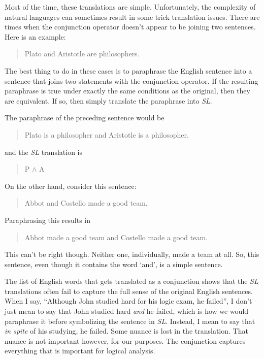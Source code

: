 \documentclass[../logic-text.tex]{subfiles}
\begin{document}
Most of the time, these translations are simple. Unfortunately, the complexity of natural languages can sometimes result in some trick translation issues. There are times when the conjunction operator doesn't appear to be joining two sentences. Here is an example:

\begin{quote}
   Plato and Aristotle are philosophers.
\end{quote}

The best thing to do in these cases is to paraphrase the English sentence into a sentence that joins two statements with the conjunction operator. If the resulting paraphrase is true under exactly the same conditions as the original, then they are equivalent. If so, then simply translate the paraphrase into \emph{SL}.

The paraphrase of the preceding sentence would be

\begin{quote}
   Plato is a philosopher and Aristotle is a philosopher.
\end{quote}

and the \emph{SL} translation is

\begin{quote}
P \(\land\) A
\end{quote}

On the other hand, consider this sentence:

\begin{quote}
Abbot and Costello made a good team.
\end{quote}

Paraphrasing this results in

\begin{quote}
  Abbot made a good team and Costello made a good team.
\end{quote}

This can't be right though. Neither one, individually, made a team at all. So, this sentence, even though it contains the word \enquote*{and}, is a simple sentence.

The list of English words that gets translated as a conjunction shows that the \emph{SL} translations often fail to capture the full sense of the original English sentences. When I say, \enquote{Although John studied hard for his logic exam, he failed}, I don't just mean to say that John studied hard \emph{and} he failed, which is how we would paraphrase it before symbolizing the sentence in \emph{SL}. Instead, I mean to say that \emph{in spite} of his studying, he failed. Some nuance is lost in the translation. That nuance is not important however, for our purposes. The conjunction captures everything that is important for logical analysis.
\end{document}
